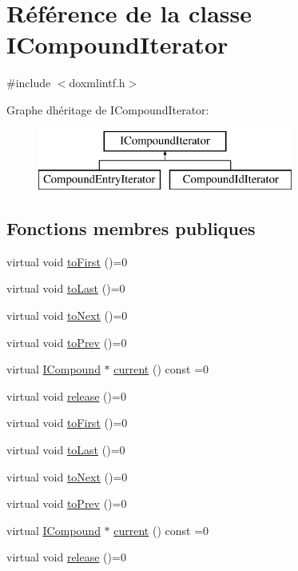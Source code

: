 \hypertarget{class_i_compound_iterator}{}\section{Référence de la classe I\+Compound\+Iterator}
\label{class_i_compound_iterator}


{\ttfamily \#include $<$doxmlintf.\+h$>$}

Graphe d\textquotesingle{}héritage de I\+Compound\+Iterator\+:\begin{figure}[H]
\begin{center}
\leavevmode
\includegraphics[height=2.000000cm]{class_i_compound_iterator}
\end{center}
\end{figure}
\subsection*{Fonctions membres publiques}
\begin{DoxyCompactItemize}
\item 
virtual void \hyperlink{class_i_compound_iterator_afeedd038aee7af106664cca550f0c9b7}{to\+First} ()=0
\item 
virtual void \hyperlink{class_i_compound_iterator_a9344ff9c3e0574b9da3240fc21a43d88}{to\+Last} ()=0
\item 
virtual void \hyperlink{class_i_compound_iterator_a9b4c1b65d047fcc32508f227ba6929bf}{to\+Next} ()=0
\item 
virtual void \hyperlink{class_i_compound_iterator_a424b2507309eb8780c9f37ad2969e518}{to\+Prev} ()=0
\item 
virtual \hyperlink{class_i_compound}{I\+Compound} $\ast$ \hyperlink{class_i_compound_iterator_a07f1bc9c8ae7c388faddfd9cc879a0e8}{current} () const  =0
\item 
virtual void \hyperlink{class_i_compound_iterator_ac794e88582cb85cf13a355b907e88cea}{release} ()=0
\item 
virtual void \hyperlink{class_i_compound_iterator_afeedd038aee7af106664cca550f0c9b7}{to\+First} ()=0
\item 
virtual void \hyperlink{class_i_compound_iterator_a9344ff9c3e0574b9da3240fc21a43d88}{to\+Last} ()=0
\item 
virtual void \hyperlink{class_i_compound_iterator_a9b4c1b65d047fcc32508f227ba6929bf}{to\+Next} ()=0
\item 
virtual void \hyperlink{class_i_compound_iterator_a424b2507309eb8780c9f37ad2969e518}{to\+Prev} ()=0
\item 
virtual \hyperlink{class_i_compound}{I\+Compound} $\ast$ \hyperlink{class_i_compound_iterator_a07f1bc9c8ae7c388faddfd9cc879a0e8}{current} () const  =0
\item 
virtual void \hyperlink{class_i_compound_iterator_ac794e88582cb85cf13a355b907e88cea}{release} ()=0
\end{DoxyCompactItemize}



